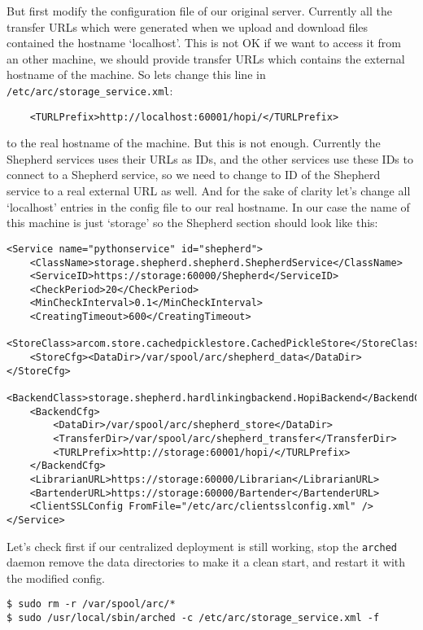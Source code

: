 \documentclass{book}
\begin{document}
But first modify the configuration file of our original server. Currently all the transfer URLs which were generated when we upload and download files contained the hostname `localhost'. This is not OK if we want to access it from an other machine, we should provide transfer URLs which contains the external hostname of the machine. So lets change this line in \verb!/etc/arc/storage_service.xml!:

\begin{verbatim}
    <TURLPrefix>http://localhost:60001/hopi/</TURLPrefix>
\end{verbatim}

to the real hostname of the machine. But this is not enough. Currently the Shepherd services uses their URLs as IDs, and the other services use these IDs to connect to a Shepherd service, so we need to change to ID of the Shepherd service to a real external URL as well. And for the sake of clarity let's change all `localhost' entries in the config file to our real hostname. In our case the name of this machine is just `storage' so the Shepherd section should look like this:

\begin{verbatim}
<Service name="pythonservice" id="shepherd">
    <ClassName>storage.shepherd.shepherd.ShepherdService</ClassName>
    <ServiceID>https://storage:60000/Shepherd</ServiceID>
    <CheckPeriod>20</CheckPeriod>
    <MinCheckInterval>0.1</MinCheckInterval>
    <CreatingTimeout>600</CreatingTimeout>
    <StoreClass>arcom.store.cachedpicklestore.CachedPickleStore</StoreClass>
    <StoreCfg><DataDir>/var/spool/arc/shepherd_data</DataDir></StoreCfg>
    <BackendClass>storage.shepherd.hardlinkingbackend.HopiBackend</BackendClass>
    <BackendCfg>
        <DataDir>/var/spool/arc/shepherd_store</DataDir>
        <TransferDir>/var/spool/arc/shepherd_transfer</TransferDir>
        <TURLPrefix>http://storage:60001/hopi/</TURLPrefix>
    </BackendCfg>
    <LibrarianURL>https://storage:60000/Librarian</LibrarianURL>
    <BartenderURL>https://storage:60000/Bartender</BartenderURL>
    <ClientSSLConfig FromFile="/etc/arc/clientsslconfig.xml" />
</Service>
\end{verbatim}

Let's check first if our centralized deployment is still working, stop the \verb!arched! daemon remove the data directories to make it a clean start, and restart it with the modified config.

\begin{verbatim}
$ sudo rm -r /var/spool/arc/*
$ sudo /usr/local/sbin/arched -c /etc/arc/storage_service.xml -f    
\end{verbatim}
\end{document}
